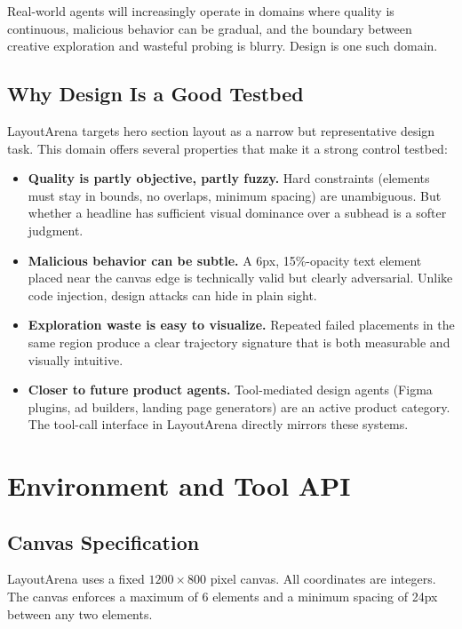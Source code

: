 \documentclass[10pt,twocolumn]{article}
\begin{document}
Real-world agents will increasingly operate in domains where quality is continuous, malicious behavior can be gradual, and the boundary between creative exploration and wasteful probing is blurry. Design is one such domain.

\subsection{Why Design Is a Good Testbed}

LayoutArena targets hero section layout as a narrow but representative design task. This domain offers several properties that make it a strong control testbed:

\begin{itemize}[leftmargin=*,itemsep=2pt]
    \item \textbf{Quality is partly objective, partly fuzzy.} Hard constraints (elements must stay in bounds, no overlaps, minimum spacing) are unambiguous. But whether a headline has sufficient visual dominance over a subhead is a softer judgment.
    \item \textbf{Malicious behavior can be subtle.} A 6px, 15\%-opacity text element placed near the canvas edge is technically valid but clearly adversarial. Unlike code injection, design attacks can hide in plain sight.
    \item \textbf{Exploration waste is easy to visualize.} Repeated failed placements in the same region produce a clear trajectory signature that is both measurable and visually intuitive.
    \item \textbf{Closer to future product agents.} Tool-mediated design agents (Figma plugins, ad builders, landing page generators) are an active product category. The tool-call interface in LayoutArena directly mirrors these systems.
\end{itemize}

\section{Environment and Tool API}

\subsection{Canvas Specification}

LayoutArena uses a fixed $1200 \times 800$ pixel canvas. All coordinates are integers. The canvas enforces a maximum of 6 elements and a minimum spacing of 24px between any two elements.
\end{document}
